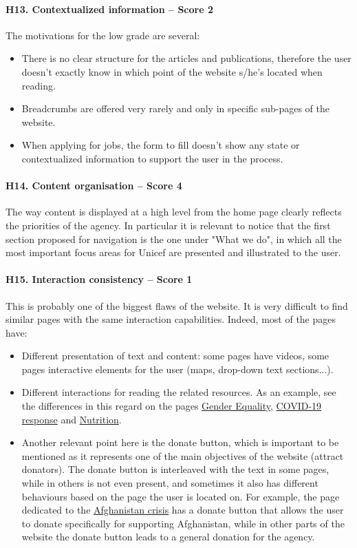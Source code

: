 \paragraph*{H13. Contextualized information – Score 2}
The motivations for the low grade are several:
\begin{itemize}
	\item There is no clear structure for the articles and publications, therefore the user doesn't exactly know in which point of the website s/he's located when reading.
	\item Breadcrumbs are offered very rarely and only in specific sub-pages of the website.
	\item When applying for jobs, the form to fill doesn't show any state or contextualized information to support the user in the process.
\end{itemize}


\paragraph*{H14. Content organisation  – Score 4}
The way content is displayed at a high level from the home page clearly reflects the priorities of the agency. In particular it is relevant to notice that the first section proposed for navigation is the one under "What we do", in which all the most important focus areas for Unicef are presented and illustrated to the user.



\paragraph*{H15. Interaction consistency – Score 1}
This is probably one of the biggest flaws of the website. It is very difficult to find similar pages with the same interaction capabilities. Indeed, most of the pages have:
\begin{itemize}
	\item Different presentation of text and content: some pages have videos, some pages interactive elements for the user (maps, drop-down text sections...).
	\item Different interactions for reading the related resources. As an example, see the differences in this regard on the pages \href{https://www.unicef.org/gender-equality}{Gender Equality}, \href{https://www.unicef.org/coronavirus/covid-19}{COVID-19 response} and \href{https://www.unicef.org/nutrition}{Nutrition}.
	\item Another relevant point here is the donate button, which is important to be mentioned as it represents one of the main objectives of the website (attract donators). The donate button is interleaved with the text in some pages, while in others is not even present, and sometimes it also has different behaviours based on the page the user is located on. For example, the page dedicated to the \href{https://www.unicef.org/emergencies/delivering-support-afghanistans-children}{Afghanistan crisis} has a donate button that allows the user to donate specifically for supporting Afghanistan, while in other parts of the website the donate button leads to a general donation for the agency.
\end{itemize}

